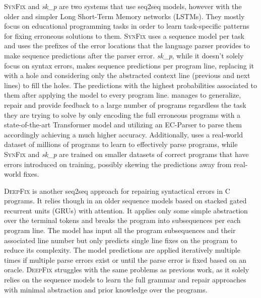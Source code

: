 %
\textsc{SynFix} \citep{Bhatia2016} and \emph{sk\_p} \citep{Pu2016} are two
systems that use seq2seq models, however with the older and simpler Long
Short-Term Memory networks (LSTMs). They mostly focus on educational programming
tasks in order to learn task-specific patterns for fixing erroneous solutions to
them. \textsc{SynFix} uses a sequence model per task and uses the prefixes of
the error locations that the language parser provides to make sequence
predictions after the parser error. \emph{sk\_p}, while it doesn't solely focus
on syntax errors, makes sequence predictions per program line, replacing it with
a hole and considering only the abstracted context line (previous and next
lines) to fill the holes. The predictions with the highest probabilities
associated to them after applying the model to every program line. \toolname
manages to generalize, repair and provide feedback to a large number of programs
regardless the task they are trying to solve by only encoding the full erroneous
programs with a state-of-the-art Transformer model and utilizing an EC-Parser to
parse them accordingly achieving a much higher accuracy. Additionally, uses a
real-world dataset of millions of \python programs to learn to effectively parse
programs, while \textsc{SynFix} and \emph{sk\_p} are trained on smaller datasets
of correct programs that have errors introduced on training, possibly skewing
the predictions away from real-world fixes.

\textsc{DeepFix} \citep{Gupta2017} is another seq2seq approach for repairing
syntactical errors in \textsc{C} programs. It relies though in an older sequence
models based on stacked gated recurrent units (GRUs) with attention. It applies
only some simple abstraction over the terminal tokens and breaks the program
into subsequences per each program line. The model has input all the program
subsequences and their associated line number but only predicts single line
fixes on the program to reduce its complexity. The model predictions are applied
iteratively multiple times if multiple parse errors exist or until the parse
error is fixed based on an oracle. \textsc{DeepFix} struggles with the same
problems as previous work, as it solely relies on the sequence models to learn
the full grammar and repair approaches with minimal abstraction and prior
knowledge over the programs.

